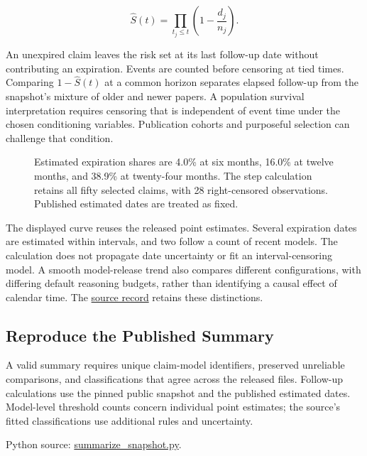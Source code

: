 \[
\widehat S(t)=\prod_{t_j\leq t}\left(1-\frac{d_j}{n_j}\right).
\]

An unexpired claim leaves the risk set at its last follow-up date
without contributing an expiration. Events are counted before censoring
at tied times. Comparing \(1-\widehat S(t)\) at a common horizon
separates elapsed follow-up from the snapshot's mixture of older and
newer papers. A population survival interpretation requires censoring
that is independent of event time under the chosen conditioning
variables. Publication cohorts and purposeful selection can challenge
that condition.

\begin{figure}[htbp]
\centering

\caption{Estimated expiration shares are 4.0\% at six months, 16.0\% at twelve months, and 38.9\% at twenty-four months. The step calculation retains all fifty selected claims, with 28 right-censored observations. Published estimated dates are treated as fixed.}\label{fig:M02_claim_followup}
\end{figure}

The displayed curve reuses the released point estimates. Several
expiration dates are estimated within intervals, and two follow a count
of recent models. The calculation does not propagate date uncertainty or
fit an interval-censoring model. A smooth model-release trend also
compares different configurations, with differing default reasoning
budgets, rather than identifying a causal effect of calendar time. The
\href{../01_Resources/14_LLM_Evidence_and_Revalidation/README.md}{source
record} retains these distinctions.

\hypertarget{M02-reproduce-the-published-summary}{%
\subsection{Reproduce the Published
Summary}\label{M02-reproduce-the-published-summary}}

\noindent \noindent A valid summary requires unique claim-model identifiers,
preserved unreliable comparisons, and classifications that agree across
the released files. Follow-up calculations use the pinned public
snapshot and the published estimated dates. Model-level threshold counts
concern individual point estimates; the source's fitted classifications
use additional rules and uncertainty.

\FloatBarrier
{}
Python source:
\href{../03_Data_and_Code/LLM_Revalidation/summarize_snapshot.py}{summarize\_snapshot.py}.

